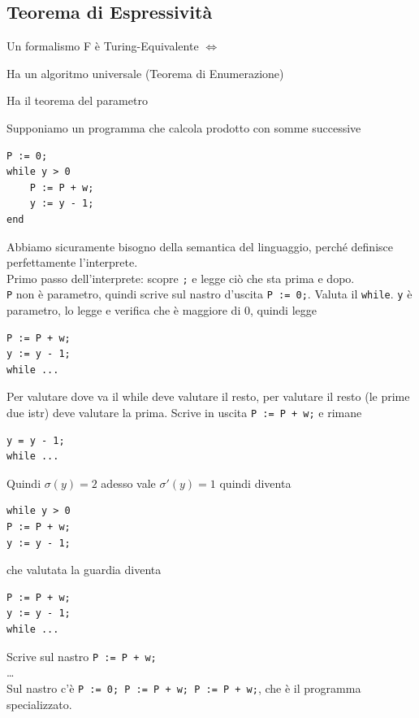 \documentclass[10pt]{book}
\begin{document}
\subsection{Teorema di Espressività}
Un formalismo F è Turing-Equivalente $\Leftrightarrow$ 
\begin{list}{-}{}
	\item Ha un algoritmo universale (Teorema di Enumerazione)
	\item Ha il teorema del parametro
\end{list}
Supponiamo un programma che calcola prodotto con somme successive
\begin{verbatim}
P := 0;
while y > 0
	P := P + w;
	y := y - 1;
end
\end{verbatim}
Abbiamo sicuramente bisogno della semantica del linguaggio, perché definisce perfettamente l'interprete.\\
Primo passo dell'interprete: scopre \texttt{;} e legge ciò che sta prima e dopo.\\
\texttt{P} non è parametro, quindi scrive sul nastro d'uscita \texttt{P := 0;}. Valuta il \texttt{while}. \texttt{y} è parametro, lo legge e verifica che è maggiore di 0, quindi legge
\begin{verbatim}
P := P + w;
y := y - 1;
while ...
\end{verbatim}
Per valutare dove va il while deve valutare il resto, per valutare il resto (le prime due istr) deve valutare la prima. Scrive in uscita \texttt{P := P + w;} e rimane
\begin{verbatim}
y = y - 1;
while ...
\end{verbatim}
Quindi $\sigma(y) = 2$ adesso vale $\sigma'(y) = 1$ quindi diventa
\begin{verbatim}
while y > 0
P := P + w;
y := y - 1;
\end{verbatim}
che valutata la guardia diventa
\begin{verbatim}
P := P + w;
y := y - 1;
while ...
\end{verbatim}
Scrive sul nastro \texttt{P := P + w;}\\
\ldots\\
Sul nastro c'è \texttt{P := 0; P := P + w; P := P + w;}, che è il programma specializzato.
\pagebreak
\end{document}
